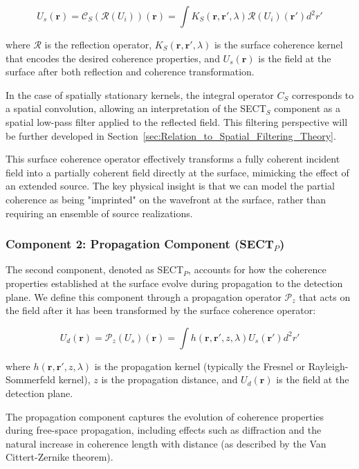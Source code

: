\documentclass[a4paper,12pt]{article}
\begin{document}
\begin{equation}
U_s(\bm{r}) = \mathcal{C}_S(\mathcal{R}(U_i))(\bm{r}) = \int K_S(\bm{r}, \bm{r}', \lambda) \mathcal{R}(U_i)(\bm{r}') d^2r'
\end{equation}

where $\mathcal{R}$ is the reflection operator, $K_S(\bm{r}, \bm{r}', \lambda)$ is the surface coherence kernel that 
encodes the desired coherence properties, and $U_s(\bm{r})$ is the field at the surface 
after both reflection and coherence transformation.

In the case of spatially stationary kernels, the integral operator \( C_S \) corresponds to a spatial convolution, 
allowing an interpretation of the SECT$_S$ component as a spatial low-pass filter applied to the reflected field. 
This filtering perspective will be further developed in Section~\ref{sec:Relation_to_Spatial_Filtering_Theory}.

This surface coherence operator effectively transforms a fully coherent incident field into a partially coherent 
field directly at the surface, mimicking the effect of an extended source. The key physical insight is that 
we can model the partial coherence as being "imprinted" on the wavefront at the surface, rather than requiring an 
ensemble of source realizations.

\subsubsection{Component 2: Propagation Component (SECT$_P$)}

The second component, denoted as SECT$_P$, accounts for how the coherence properties established at the surface evolve during propagation to the detection plane. We define this component through a propagation operator $\mathcal{P}_z$ that acts on the field after it has been transformed by the surface coherence operator:

\begin{equation}
U_d(\bm{r}) = \mathcal{P}_z(U_s)(\bm{r}) = \int h(\bm{r}, \bm{r}', z, \lambda) U_s(\bm{r}') d^2r'
\end{equation}

where $h(\bm{r}, \bm{r}', z, \lambda)$ is the propagation kernel (typically the Fresnel or Rayleigh-Sommerfeld kernel), $z$ is the propagation distance, and $U_d(\bm{r})$ is the field at the detection plane.

The propagation component captures the evolution of coherence properties during free-space propagation, including effects such as diffraction and the natural increase in coherence length with distance (as described by the Van Cittert-Zernike theorem).
\end{document}
